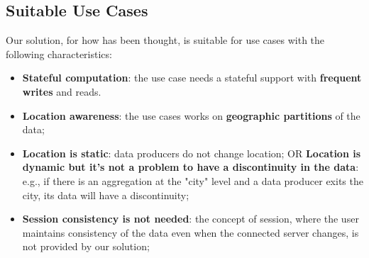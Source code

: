 \subsection{Suitable Use Cases}
Our solution, for how has been thought, is suitable for use cases with the following characteristics:
\begin{itemize}
    \item \textbf{Stateful computation}: the use case needs a stateful support with \textbf{frequent writes} and reads.
    \item \textbf{Location awareness}: the use cases works on \textbf{geographic partitions} of the data;
    \item \textbf{Location is static}: data producers do not change location; OR \textbf{Location is dynamic but it’s not a problem to have a discontinuity in the data}: e.g., if there is an aggregation at the "city" level and a data producer exits the city, its data will have a discontinuity;
    \item \textbf{Session consistency is not needed}: the concept of session, where the user maintains consistency of the data even when the connected server changes, is not provided by our solution;
\end{itemize}
